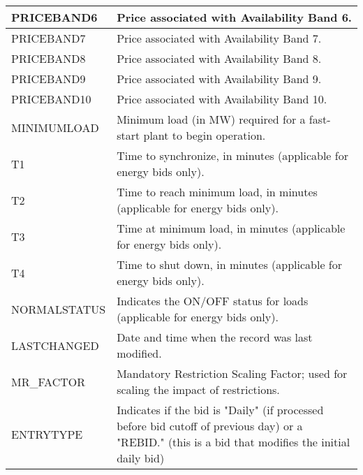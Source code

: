 \documentclass{article}
\begin{document}
\begin{table}[ht]
\begin{tabularx}{\textwidth}{|l|X|}
PRICEBAND6 & Price associated with Availability Band 6. \\
\hline
PRICEBAND7 & Price associated with Availability Band 7. \\
\hline
PRICEBAND8 & Price associated with Availability Band 8. \\
\hline
PRICEBAND9 & Price associated with Availability Band 9. \\
\hline
PRICEBAND10 & Price associated with Availability Band 10. \\
\hline
MINIMUMLOAD & Minimum load (in MW) required for a fast-start plant to begin operation. \\
\hline
T1 & Time to synchronize, in minutes (applicable for energy bids only). \\
\hline
T2 & Time to reach minimum load, in minutes (applicable for energy bids only). \\
\hline
T3 & Time at minimum load, in minutes (applicable for energy bids only). \\
\hline
T4 & Time to shut down, in minutes (applicable for energy bids only). \\
\hline
NORMALSTATUS & Indicates the ON/OFF status for loads (applicable for energy bids only). \\
\hline
LASTCHANGED & Date and time when the record was last modified. \\
\hline
MR\_FACTOR & Mandatory Restriction Scaling Factor; used for scaling the impact of restrictions. \\
\hline
ENTRYTYPE & Indicates if the bid is "Daily" (if processed before bid cutoff of previous day) or a "REBID." (this is a bid that modifies the initial daily bid) \\
\hline
\end{tabularx}
\end{table}
\end{document}
